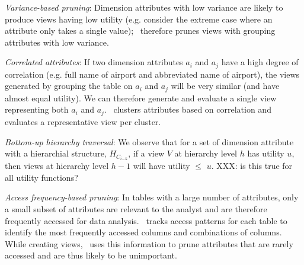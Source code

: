 \squishlist
\item {\it Variance-based pruning}: Dimension attributes with low variance are
likely to produce views having low utility (e.g. consider the extreme case where
an attribute only takes a single value); \SeeDB\ therefore prunes views
with grouping attributes with low variance.
\item {\it Correlated attributes}: If two dimension attributes $a_i$ and $a_j$ have
a high degree of correlation (e.g. full name of airport and abbreviated name of
airport), the views generated by grouping the table on $a_i$ and $a_j$ will be
very similar (and have almost equal utility). We can therefore generate and
evaluate a single view representing both $a_i$ and $a_j$. \SeeDB\ clusters
attributes based on correlation and evaluates a representative view per
cluster.
\item {\it Bottom-up hierarchy traversal}: 
We observe that for a set of
  dimension attribute with a hierarchial structure, $H_{C_{i\ldots k}}$, if a
  view $V$ at hierarchy level $h$ has utility $u$, then views at hierarchy level
  $h-1$ will have utility $\leq$ $u$. XXX: is this true for all utility
  functions? 
\item {\it Access frequency-based pruning}: In tables with a large number of
attributes, only a small subset of attributes are relevant to the analyst and
are therefore frequently accessed for data analysis. \SeeDB\ tracks access patterns
for each table to identify the most frequently accessed columns and combinations of
columns. While creating views, \SeeDB\ uses this information to prune attributes
that are rarely accessed and are thus likely to be unimportant.
\squishend





